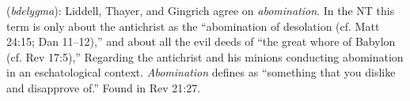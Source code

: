 \item[Abomination,]

(\textit{bdelygma}):
Liddell, Thayer, and Gingrich agree on \emph{abomination}. In the NT this term is only about the antichrist as the ``abomination of desolation (cf. Matt 24:15; Dan 11--12),'' and about all the evil deeds of ``the great whore of Babylon (cf. Rev 17:5),'' Regarding the antichrist and his minions conducting abomination in an eschatological context. \emph{Abomination} defines as ``something that you dislike and disapprove of.''
Found in Rev 21:27.
